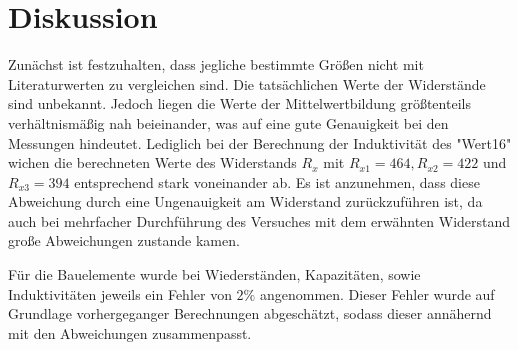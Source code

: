 \section{Diskussion}
\label{sec:Diskussion}

Zunächst ist festzuhalten, dass jegliche bestimmte Größen nicht mit Literaturwerten 
zu vergleichen sind. Die tatsächlichen Werte der Widerstände sind unbekannt.
Jedoch liegen die Werte der Mittelwertbildung größtenteils verhältnismäßig nah
beieinander, was auf eine gute Genauigkeit bei den Messungen hindeutet. 
Lediglich bei der Berechnung der Induktivität des "Wert16" wichen die berechneten
Werte des Widerstands $R_x$ mit $R_{x1} = 464, R_{x2} = 422$ und $R_{x3} = 394$ 
entsprechend stark voneinander ab.
Es ist anzunehmen, dass diese Abweichung durch eine Ungenauigkeit am Widerstand 
zurückzuführen ist, da auch bei mehrfacher Durchführung des Versuches mit dem 
erwähnten Widerstand große Abweichungen zustande kamen.
\par\vspace{0.5em}
\noindent Für die Bauelemente wurde bei Wiederständen, Kapazitäten,
sowie Induktivitäten jeweils ein Fehler von $2 \%$ angenommen. Dieser Fehler
wurde auf Grundlage vorhergeganger Berechnungen abgeschätzt, sodass dieser
annähernd mit den Abweichungen zusammenpasst.

